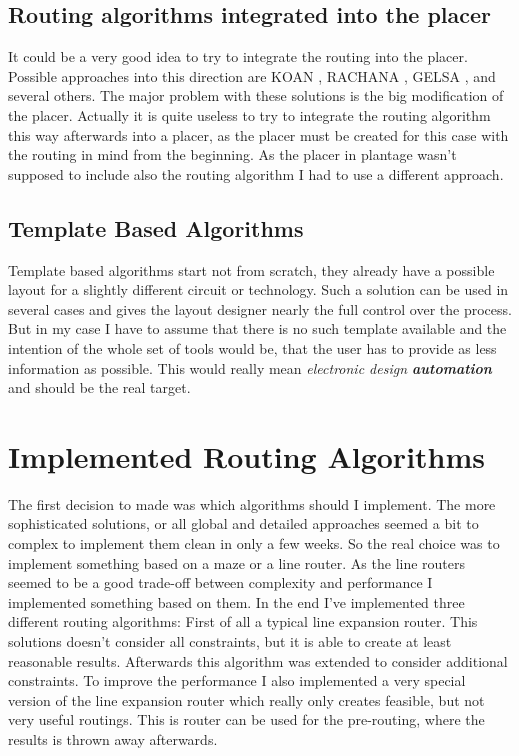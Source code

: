 \subsection{Routing algorithms integrated into the placer}
It could be a very good idea to try to integrate the routing into the placer. Possible approaches into this direction are KOAN \cite[page 178]{springer:eda_analog_routing}, RACHANA \cite[page 178]{springer:eda_analog_routing}, GELSA \cite[page 179]{springer:eda_analog_routing}, and several others. The major problem with these solutions is the big modification of the placer. Actually it is quite useless to try to integrate the routing algorithm this way afterwards into a placer, as the placer must be created for this case with the routing in mind from the beginning. As the placer in plantage wasn't supposed to include also the routing algorithm I had to use a different approach.

\subsection{Template Based Algorithms}
Template based algorithms start not from scratch, they already have a possible layout for a slightly different circuit or technology. Such a solution can be used in several cases and gives the layout designer nearly the full control over the process. But in my case I have to assume that there is no such template available and the intention of the whole set of tools would be, that the user has to provide as less information as possible. This would really mean \textit{electronic design \textbf{automation}} and should be the real target.

\section{Implemented Routing Algorithms}
The first decision to made was which algorithms should I implement. The more sophisticated solutions, or all global and detailed approaches seemed a bit to complex to implement them clean in only a few weeks. So the real choice was to implement something based on a maze or a line router. As the line routers seemed to be a good trade-off between complexity and performance I implemented something based on them. In the end I've implemented three different routing algorithms: First of all a typical line expansion router. This solutions doesn't consider all constraints, but it is able to create at least reasonable results. Afterwards this algorithm was extended to consider additional constraints. To improve the performance I also implemented a very special version of the line expansion router which really only creates feasible, but not very useful routings. This is router can be used for the pre-routing, where the results is thrown away afterwards.

